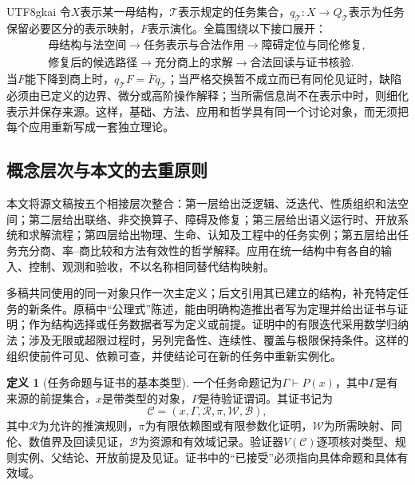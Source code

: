 \documentclass[11pt,a4paper]{article}
\theoremstyle{plain}
\theoremstyle{definition}
\newtheorem{definition}[theorem]{定义}
\theoremstyle{remark}
\begin{document}
\begin{CJK*}{UTF8}{gkai}
令$X$表示某一母结构，$\mathcal T$表示规定的任务集合，$q_{\mathcal T}:X\to Q_{\mathcal T}$表示为任务保留必要区分的表示映射，$F$表示演化。全篇围绕以下接口展开：
\begin{equation}
\label{eq:global-spine}
\begin{gathered}
\text{母结构与法空间}
\longrightarrow \text{任务表示与合法作用}
\longrightarrow \text{障碍定位与同伦修复},\\
\text{修复后的候选路径}
\longrightarrow \text{充分商上的求解}
\longrightarrow \text{合法回读与证书核验}.
\end{gathered}
\end{equation}
当$F$能下降到商上时，$q_{\mathcal T}F=\bar Fq_{\mathcal T}$；当严格交换暂不成立而已有同伦见证时，缺陷必须由已定义的边界、微分或高阶操作解释；当所需信息尚不在表示中时，则细化表示并保存来源。这样，基础、方法、应用和哲学具有同一个讨论对象，而无须把每个应用重新写成一套独立理论。

\subsection{概念层次与本文的去重原则}
本文将源文稿按五个相接层次整合：第一层给出泛逻辑、泛迭代、性质组织和法空间；第二层给出联络、非交换算子、障碍及修复；第三层给出语义运行时、开放系统和求解流程；第四层给出物理、生命、认知及工程中的任务实例；第五层给出任务充分商、率--商比较和方法有效性的哲学解释。应用在统一结构中有各自的输入、控制、观测和验收，不以名称相同替代结构映射。

多稿共同使用的同一对象只作一次主定义；后文引用其已建立的结构，补充特定任务的新条件。原稿中“公理式”陈述，能由明确构造推出者写为定理并给出证书与证明；作为结构选择或任务数据者写为定义或前提。证明中的有限迭代采用数学归纳法；涉及无限或超限过程时，另列完备性、连续性、覆盖与极限保持条件。这样的组织使前件可见、依赖可查，并使结论可在新的任务中重新实例化。

\begin{definition}[任务命题与证书的基本类型]
\label{def:task-certificate}
一个任务命题记为$\Gamma\vdash P(x)$，其中$\Gamma$是有来源的前提集合，$x$是带类型的对象，$P$是待验证谓词。其证书记为
\[
\mathcal C=(x,\Gamma,\mathcal R,\pi,\mathcal W,\mathcal B),
\]
其中$\mathcal R$为允许的推演规则，$\pi$为有限依赖图或有限参数化证明，$\mathcal W$为所需映射、同伦、数值界及回读见证，$\mathcal B$为资源和有效域记录。验证器$V(\mathcal C)$逐项核对类型、规则实例、父结论、开放前提及见证。证书中的“已接受”必须指向具体命题和具体有效域。
\end{definition}


\end{CJK*}
\end{document}
